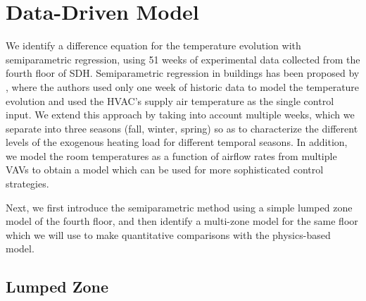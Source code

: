 
\section{Data-Driven Model}
\label{sec:Data_Driven_Model}
We identify a difference equation for the temperature evolution with semiparametric regression, using 51 weeks of experimental data collected from the fourth floor of SDH. Semiparametric regression in buildings has been proposed by \cite{Aswani:2012aa}, where the authors used only one week of historic data to model the temperature evolution and used the HVAC's supply air temperature as the single control input. %
We extend this approach by taking into account multiple weeks, which we separate into three seasons (fall, winter, spring) so as to characterize the different levels of the exogenous heating load for different temporal seasons. 
In addition, we model the room temperatures as a function of airflow rates from multiple VAVs to obtain a model which can be used for more sophisticated control strategies.

Next, we first introduce the semiparametric method using a simple lumped zone model of the fourth floor, and then identify a multi-zone model for the same floor which we will use to make quantitative comparisons with the physics-based model.

\subsection{Lumped Zone}
\label{sec:Lumped_Zone}
